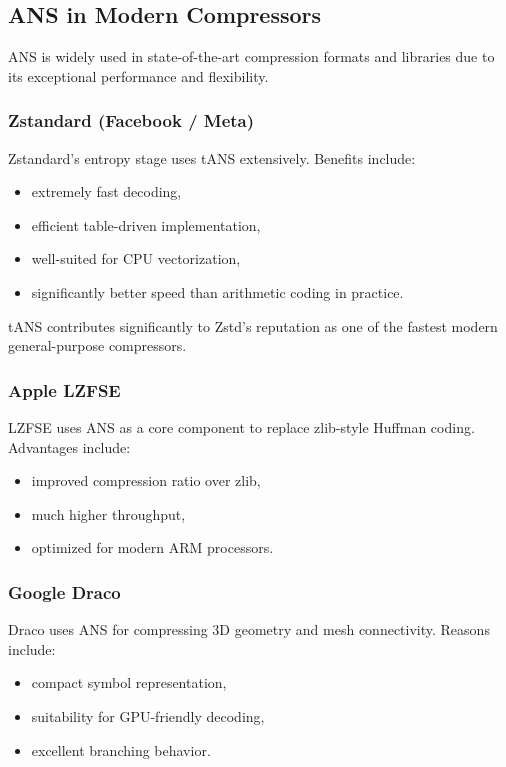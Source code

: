 \subsection{ANS in Modern Compressors}

ANS is widely used in state-of-the-art compression formats and libraries due to its exceptional performance and flexibility.

\subsubsection{Zstandard (Facebook / Meta)}

Zstandard's entropy stage uses tANS extensively.  
Benefits include:

\begin{itemize}
    \item extremely fast decoding,
    \item efficient table-driven implementation,
    \item well-suited for CPU vectorization,
    \item significantly better speed than arithmetic coding in practice.
\end{itemize}

tANS contributes significantly to Zstd's reputation as one of the fastest modern general-purpose compressors.

\subsubsection{Apple LZFSE}

LZFSE uses ANS as a core component to replace zlib-style Huffman coding.  
Advantages include:

\begin{itemize}
    \item improved compression ratio over zlib,
    \item much higher throughput,
    \item optimized for modern ARM processors.
\end{itemize}

\subsubsection{Google Draco}

Draco uses ANS for compressing 3D geometry and mesh connectivity.  
Reasons include:

\begin{itemize}
    \item compact symbol representation,
    \item suitability for GPU-friendly decoding,
    \item excellent branching behavior.
\end{itemize}

